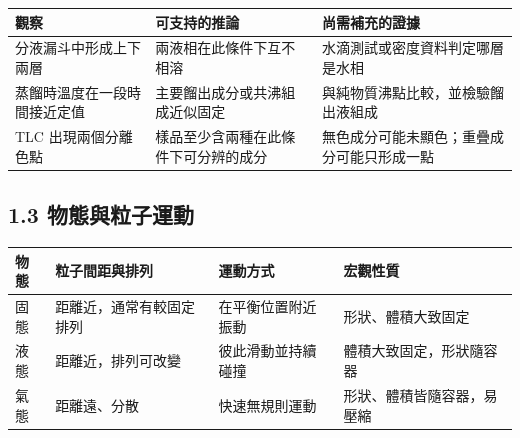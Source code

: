 \documentclass[11pt,a4paper]{article}
\newcounter{none}
\begin{document}
{\def\LTcaptype{none} %
\begin{longtable}[]{@{}
  >{\raggedright\arraybackslash}p{}
  >{\raggedright\arraybackslash}p{}
  >{\raggedright\arraybackslash}p{}@{}}
\toprule\noalign{}
\begin{minipage}[b]{\linewidth}\raggedright
觀察
\end{minipage} & \begin{minipage}[b]{\linewidth}\raggedright
可支持的推論
\end{minipage} & \begin{minipage}[b]{\linewidth}\raggedright
尚需補充的證據
\end{minipage} \\
\midrule\noalign{}
\endhead
\bottomrule\noalign{}
\endlastfoot
分液漏斗中形成上下兩層 & 兩液相在此條件下互不相溶 & 水滴測試或密度資料判定哪層是水相 \\
蒸餾時溫度在一段時間接近定值 & 主要餾出成分或共沸組成近似固定 & 與純物質沸點比較，並檢驗餾出液組成 \\
TLC 出現兩個分離色點 & 樣品至少含兩種在此條件下可分辨的成分 & 無色成分可能未顯色；重疊成分可能只形成一點 \\
\end{longtable}
}

\subsection{1.3 物態與粒子運動}\label{ux7269ux614bux8207ux7c92ux5b50ux904bux52d5}

{\def\LTcaptype{none} %
\begin{longtable}[]{@{}
  >{\raggedright\arraybackslash}p{}
  >{\raggedright\arraybackslash}p{}
  >{\raggedright\arraybackslash}p{}
  >{\raggedright\arraybackslash}p{}@{}}
\toprule\noalign{}
\begin{minipage}[b]{\linewidth}\raggedright
物態
\end{minipage} & \begin{minipage}[b]{\linewidth}\raggedright
粒子間距與排列
\end{minipage} & \begin{minipage}[b]{\linewidth}\raggedright
運動方式
\end{minipage} & \begin{minipage}[b]{\linewidth}\raggedright
宏觀性質
\end{minipage} \\
\midrule\noalign{}
\endhead
\bottomrule\noalign{}
\endlastfoot
固態 & 距離近，通常有較固定排列 & 在平衡位置附近振動 & 形狀、體積大致固定 \\
液態 & 距離近，排列可改變 & 彼此滑動並持續碰撞 & 體積大致固定，形狀隨容器 \\
氣態 & 距離遠、分散 & 快速無規則運動 & 形狀、體積皆隨容器，易壓縮 \\
\end{longtable}
}
\end{document}
